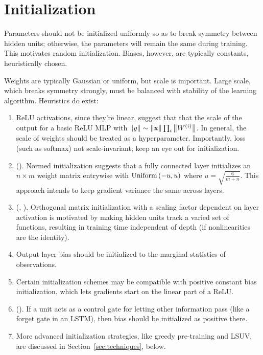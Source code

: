 \documentclass{article}
\begin{document}
\section{Initialization}

Parameters should not be initialized uniformly so as to break symmetry between hidden units; otherwise, the parameters will remain the same during training. This motivates random initialization. Biases, however, are typically constants, heuristically chosen.

Weights are typically Gaussian or uniform, but scale is important. Large scale, which breaks symmetry strongly, must be balanced with stability of the learning algorithm. Heuristics do exist:

\begin{enumerate}
\item ReLU activations, since they're linear, suggest that that the scale of the output for a basic ReLU MLP with $\left\| y \right\|\sim \left\| \textbf{x} \right\|\prod_i\left\| W^{(i)} \right\|$. In general, the scale of weights should be treated as a hyperparameter. Importantly, loss (such as softmax) not scale-invariant; keep an eye out for initialization.
\item (). Normed initialization suggests that a fully connected layer initializes an $n\times m$ weight matrix entrywise with $\operatorname{Uniform}\left({-u, u}\right)$ where $u=\sqrt{\frac{6}{m+n}}$. This approach intends to keep gradient variance the same across layers.
\item (, ). Orthogonal matrix initialization with a scaling factor dependent on layer activation is motivated by making hidden units track a varied set of functions, resulting in training time independent of depth (if nonlinearities are the identity).
\item Output layer bias should be initialized to the marginal statistics of observations.
\item Certain initialization schemes may be compatible with positive constant bias initialization, which lets gradients start on the linear part of a ReLU.
\item (). If a unit acts as a control gate for letting other information pass (like a forget gate in an LSTM), then bias should be initialized as positive there.
\item More advanced initialization strategies, like greedy pre-training and LSUV, are discussed in Section~\ref{sec:techniques}, below.
\end{enumerate}
\end{document}
